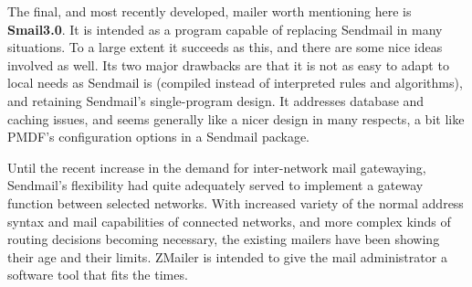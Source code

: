 The final, and most recently developed, mailer worth mentioning here is
{\bf Smail3.0}. It is intended as a program capable of replacing Sendmail in many
situations. To a large extent it succeeds as this, and there are some nice
ideas involved as well. Its two major drawbacks are that it is not as easy
to adapt to local needs as Sendmail is (compiled instead of interpreted
rules and algorithms), and retaining Sendmail's single-program design.  It
addresses database and caching issues, and seems generally like a nicer
design in many respects, a bit like PMDF's configuration options in a
Sendmail package.

Until the recent increase in the demand for inter-network mail gatewaying,
Sendmail's flexibility had quite adequately served to implement a gateway
function between selected networks.  With increased variety of the normal
address syntax and mail capabilities of connected networks, and more complex
kinds of routing decisions becoming necessary, the existing mailers have
been showing their age and their limits.  ZMailer is intended to give the
mail administrator a software tool that fits the times.
